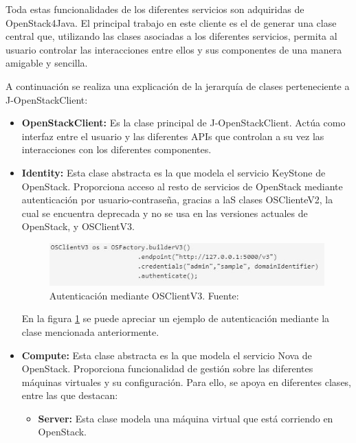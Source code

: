 Toda estas funcionalidades de los diferentes servicios son adquiridas de OpenStack4Java. El principal trabajo en este cliente es el de generar una clase central que, utilizando las clases asociadas a los diferentes servicios, permita al usuario controlar las interacciones entre ellos y sus componentes de una manera amigable y sencilla.

A continuación se realiza una explicación de la jerarquía de clases perteneciente a J-OpenStackClient:

\begin{itemize}
	
	\item \textbf{OpenStackClient:} Es la clase principal de J-OpenStackClient. Actúa como interfaz entre el usuario y las diferentes \acp{API} que controlan a su vez las interacciones con los diferentes componentes.
	
	\item \textbf{Identity:} Esta clase abstracta es la que modela el servicio KeyStone de OpenStack. Proporciona acceso al resto de servicios de OpenStack mediante autenticación por usuario-contraseña, gracias a laS clases OSClienteV2, la cual se encuentra deprecada y no se usa en las versiones actuales de OpenStack, y OSClientV3.
	
	\begin{figure}[!ht]
		\centering
		\includegraphics[width=0.8\linewidth]{imagenes/authOSClientV3}
		\caption{Autenticación mediante OSClientV3. Fuente:\cite{openstack4jbib}}
		\label{fig:authosclientv3}
	\end{figure}
	
	En la figura \ref{fig:authosclientv3} se puede apreciar un ejemplo de autenticación mediante la clase mencionada anteriormente. 
	
	\item \textbf{Compute:} Esta clase abstracta es la que modela el servicio Nova de OpenStack. Proporciona funcionalidad de gestión sobre las diferentes máquinas virtuales y su configuración. Para ello, se apoya en diferentes clases, entre las que destacan:
	
	\begin{itemize}
		
		\item \textbf{Server:} Esta clase modela una máquina virtual que está corriendo en OpenStack. 
		

\end{itemize}
\end{itemize}
